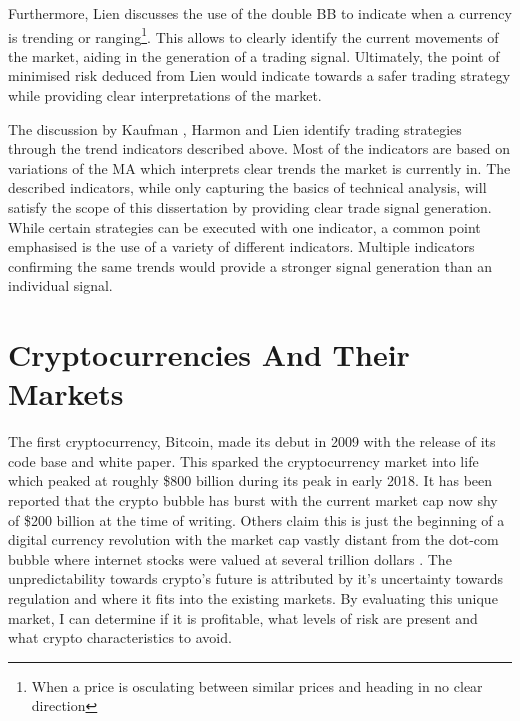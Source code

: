 Furthermore, Lien \cite{BOOK:Lien:2016} discusses the use of the double BB to indicate when a currency is trending or ranging\footnote{When a price is osculating between similar prices and heading in no clear direction}. This allows to clearly identify the current movements of the market, aiding in the generation of a trading signal. Ultimately, the point of minimised risk deduced from Lien would indicate towards a safer trading strategy while providing clear interpretations of the market. 

The discussion by Kaufman \cite{BOOK:Kaufman:2013}, Harmon \cite{BOOK:Harmon:2014} and Lien \cite{BOOK:Lien:2016} identify trading strategies through the trend indicators described above. Most of the indicators are based on variations of the MA which interprets clear trends the market is currently in. The described indicators, while only capturing the basics of technical analysis, will satisfy the scope of this dissertation by providing clear trade signal generation. While certain strategies can be executed with one indicator, a common point emphasised is the use of a variety of different indicators. Multiple indicators confirming the same trends would provide a stronger signal generation than an individual signal. 


\section{Cryptocurrencies And Their Markets}
\label{sec:related:cryptoAndTheirMarkets}

\noindent The first cryptocurrency, Bitcoin, made its debut in 2009 with the release of its code base and white paper. This sparked the cryptocurrency market into life which peaked at roughly \$800 billion during its peak in early 2018. It has been reported that the crypto bubble has burst with the current market cap now shy of \$200 billion at the time of writing. Others claim this is just the beginning of a digital currency revolution with the market cap vastly distant from the dot-com bubble where internet stocks were valued at several trillion dollars \cite{ART:Kharpal:2018}. The unpredictability towards crypto's future is attributed by it's uncertainty towards regulation and where it fits into the existing markets. By evaluating this unique market, I can determine if it is profitable, what levels of risk are present and what crypto characteristics to avoid.

